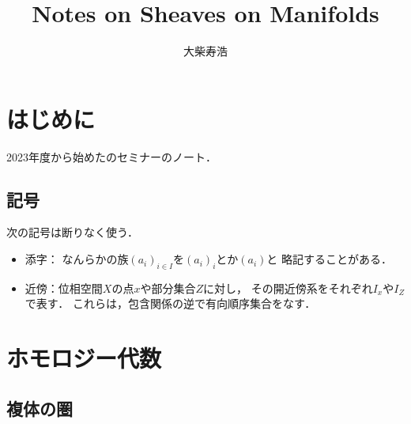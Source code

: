 

\def\inner<#1>{\langle #1 \rangle}








\title{Notes on Sheaves on Manifolds}
\author{大柴寿浩}
\date{}

\maketitle
\frontmatter
\layout
\chapter*{はじめに}
2023年度から始めた\cite{KS90}のセミナーのノート．

\section*{記号}
次の記号は断りなく使う．
\begin{itemize}
    \item 添字：
    なんらかの族$(a_i)_{i\in I}$を$(a_i)_i$とか$(a_i)$と
    略記することがある．
    \item 近傍：位相空間\(X\)の点\(x\)や部分集合\(Z\)に対し，
    その開近傍系をそれぞれ\(I_x\)や\(I_Z\)で表す．
    これらは，包含関係の逆で有向順序集合をなす．
\end{itemize}
\mainmatter
\chapter{ホモロジー代数}
\setcounter{section}{2}

\section{複体の圏}

